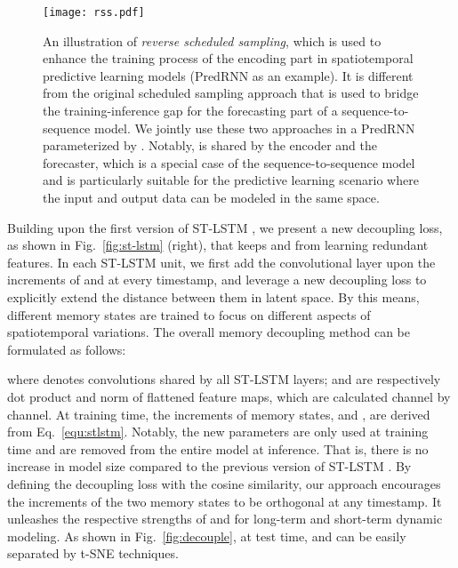\documentclass[10pt,journal,compsoc]{IEEEtran}
\let\MYoriglatexcaption\caption
\renewcommand{\caption}[2][\relax]{\MYoriglatexcaption[#2]{#2}}
\newcommand{\eqn}[1]{Eq.~\eqref{#1}}
\newcommand{\fig}[1]{Fig.~\ref{#1}}
\begin{document}
\begin{figure*}[t]
  \centering
  \texttt{[image: rss.pdf]}
  \caption{An illustration of \textit{reverse scheduled sampling}, which is used to enhance the training process of the encoding part in spatiotemporal predictive learning models (PredRNN as an example). It is different from the original scheduled sampling approach that is used to bridge the training-inference gap for the forecasting part of a sequence-to-sequence model. We jointly use these two approaches in a PredRNN parameterized by . Notably,  is shared by the encoder and the forecaster, which is a special case of the sequence-to-sequence model and is particularly suitable for the predictive learning scenario where the input and output data can be modeled in the same space.
  }
  \label{fig:rss}
\end{figure*}



Building upon the first version of ST-LSTM \cite{wang2017predrnn}, we present a new decoupling loss, as shown in \fig{fig:st-lstm} (right), that keeps  and  from learning redundant features.
In each ST-LSTM unit, we first add the convolutional layer upon the increments of  and  at every timestamp, and leverage a new decoupling loss to explicitly extend the distance between them in latent space. 
By this means, different memory states are trained to focus on different aspects of spatiotemporal variations.
The overall memory decoupling method can be formulated as follows:

where  denotes  convolutions shared by all ST-LSTM layers;  and  are respectively dot product and  norm of flattened feature maps, which are calculated channel by channel.
At training time, the increments of memory states,  and , are derived from \eqn{equ:stlstm}.
Notably, the new parameters are only used at training time and are removed from the entire model at inference. That is, there is no increase in model size compared to the previous version of ST-LSTM \cite{wang2017predrnn}.
By defining the decoupling loss with the cosine similarity, our approach encourages the increments of the two memory states to be orthogonal at any timestamp. It unleashes the respective strengths of  and  for long-term and short-term dynamic modeling.
As shown in \fig{fig:decouple}, at test time,  and  can be easily separated by t-SNE techniques.
\end{document}
